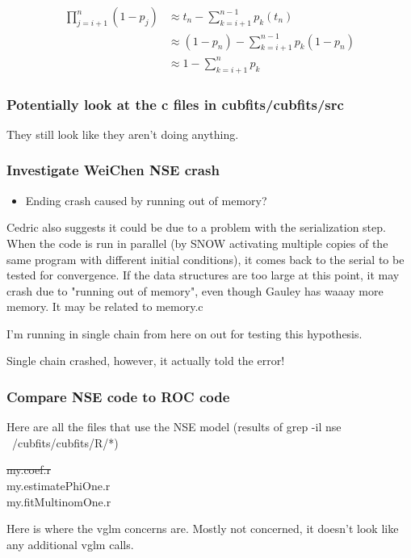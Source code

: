 \documentclass[11pt]{article} %
\begin{document}
\begin{align*}
	\prod_{j=i+1}^{n} (1-p_j) &\approx
	t_n - \sum_{k=i+1}^{n-1}p_k(t_n) \\
	&\approx (1-p_n) - \sum_{k=i+1}^{n-1}p_k(1 - p_n)\\
 	&\approx 1 -  \sum_{k=i+1}^{n}p_k
\end{align*}

\subsubsection{Potentially look at the c files in cubfits/cubfits/src}
They still look like they aren't doing anything.

\subsubsection{Investigate WeiChen NSE crash}
\begin{itemize}
\item Ending crash caused by running out of memory?
\end{itemize}

Cedric also suggests it could be due to a problem with the serialization step. When the code is run in parallel (by SNOW activating multiple copies of the same program with different initial conditions), it comes back to the serial to be tested for convergence. If the data structures are too large at this point, it may crash due to "running out of memory", even though Gauley has waaay more memory. It may be related to memory.c

I'm running in single chain from here on out for testing this hypothesis.

Single chain crashed, however, it actually told the error!



\subsubsection{Compare NSE code to ROC code}

Here are all the files that use the NSE model (results of grep -il nse ~/cubfits/cubfits/R/*)


\sout{my.coef.r}\\

my.estimatePhiOne.r\\
my.fitMultinomOne.r

Here is where the vglm concerns are. Mostly not concerned, it doesn't look like any additional vglm calls.\\
\end{document}
